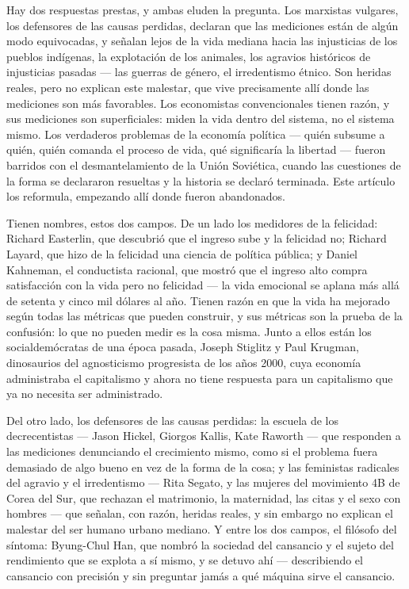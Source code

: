 \documentclass[11pt]{article}
\begin{document}
Hay dos respuestas prestas, y ambas eluden la pregunta. Los marxistas
vulgares, los defensores de las causas perdidas, declaran que las
mediciones están de algún modo equivocadas, y señalan lejos de la vida
mediana hacia las injusticias de los pueblos indígenas, la explotación
de los animales, los agravios históricos de injusticias pasadas --- las
guerras de género, el irredentismo étnico. Son heridas reales, pero no
explican este malestar, que vive precisamente allí donde las mediciones
son más favorables. Los economistas convencionales tienen razón, y sus
mediciones son superficiales: miden la vida dentro del sistema, no el
sistema mismo. Los verdaderos problemas de la economía política ---
quién subsume a quién, quién comanda el proceso de vida, qué
significaría la libertad --- fueron barridos con el desmantelamiento
de la Unión Soviética, cuando las cuestiones de la forma se declararon
resueltas y la historia se declaró terminada. Este artículo los
reformula, empezando allí donde fueron abandonados.

Tienen nombres, estos dos campos. De un lado los medidores de la
felicidad: Richard Easterlin, que descubrió que el ingreso sube y la
felicidad no; Richard Layard, que hizo de la felicidad una ciencia de
política pública; y Daniel Kahneman, el conductista racional, que mostró
que el ingreso alto compra satisfacción con la vida pero no felicidad
--- la vida emocional se aplana más allá de setenta y cinco mil dólares
al año. Tienen razón en que la vida ha mejorado según todas las
métricas que pueden construir, y sus métricas son la prueba de la
confusión: lo que no pueden medir es la cosa misma. Junto a ellos están
los socialdemócratas de una época pasada, Joseph Stiglitz y Paul
Krugman, dinosaurios del agnosticismo progresista de los años 2000,
cuya economía administraba el capitalismo y ahora no tiene respuesta
para un capitalismo que ya no necesita ser administrado.

Del otro lado, los defensores de las causas perdidas: la escuela de los
decrecentistas --- Jason Hickel, Giorgos Kallis, Kate Raworth --- que
responden a las mediciones denunciando el crecimiento mismo, como si el
problema fuera demasiado de algo bueno en vez de la forma de la cosa; y
las feministas radicales del agravio y el irredentismo --- Rita Segato,
y las mujeres del movimiento 4B de Corea del Sur, que rechazan el
matrimonio, la maternidad, las citas y el sexo con hombres --- que
señalan, con razón, heridas reales, y sin embargo no explican el
malestar del ser humano urbano mediano. Y entre los dos campos, el
filósofo del síntoma: Byung-Chul Han, que nombró la sociedad del
cansancio y el sujeto del rendimiento que se explota a sí mismo, y se
detuvo ahí --- describiendo el cansancio con precisión y sin preguntar
jamás a qué máquina sirve el cansancio.
\end{document}
